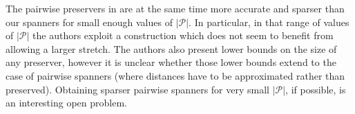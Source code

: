 \documentclass[a4paper,11pt]{article}
\theoremstyle{definition}
\newcommand{\cP}{\mathcal{P}}
\begin{document}
The pairwise preservers in \cite{CE05} are at the same time more accurate and sparser than our spanners for small enough values of $|\cP|$. In particular, in that range of values of $|\cP|$ the authors exploit a construction which does not seem to benefit from allowing a larger stretch. The authors also present lower bounds on the size of any preserver, however it is unclear whether those lower bounds extend to the case of pairwise spanners (where distances have to be approximated rather than preserved). Obtaining sparser pairwise spanners for very small $|\cP|$, if possible, is an interesting open problem.
\end{document}
